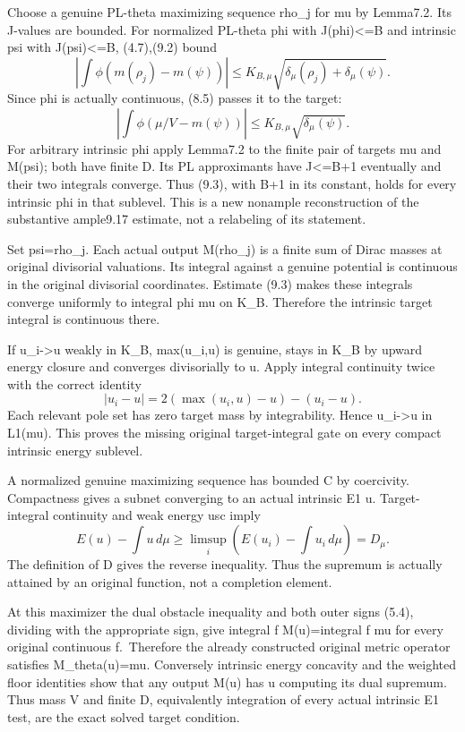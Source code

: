 \documentclass[
  10pt,
]{article}
\begin{document}
Choose a genuine PL-theta maximizing sequence rho\_j for mu by Lemma7.2.
Its J-values are bounded. For normalized PL-theta phi with
J(phi)\textless=B and intrinsic psi with J(psi)\textless=B, (4.7),(9.2)
bound \[
 \left|\int\phi(m(\rho_j)-m(\psi))\right|
 \le K_{B,\mu}\sqrt{\delta_\mu(\rho_j)+\delta_\mu(\psi)}.
\] Since phi is actually continuous, (8.5) passes it to the target: \[
 \left|\int\phi(\mu/V-m(\psi))\right|\le K_{B,\mu}\sqrt{\delta_\mu(\psi)}. \tag{9.3}
\] For arbitrary intrinsic phi apply Lemma7.2 to the finite pair of
targets mu and M(psi); both have finite D. Its PL approximants have
J\textless=B+1 eventually and their two integrals converge. Thus (9.3),
with B+1 in its constant, holds for every intrinsic phi in that
sublevel. This is a new nonample reconstruction of the substantive
ample9.17 estimate, not a relabeling of its statement.

Set psi=rho\_j. Each actual output M(rho\_j) is a finite sum of Dirac
masses at original divisorial valuations. Its integral against a genuine
potential is continuous in the original divisorial coordinates. Estimate
(9.3) makes these integrals converge uniformly to integral phi mu on
K\_B. Therefore the intrinsic target integral is continuous there.

If u\_i-\textgreater u weakly in K\_B, max(u\_i,u) is genuine, stays in
K\_B by upward energy closure and converges divisorially to u. Apply
integral continuity twice with the correct identity \[
 |u_i-u|=2(\max(u_i,u)-u)-(u_i-u).                                     \tag{9.4}
\] Each relevant pole set has zero target mass by integrability. Hence
u\_i-\textgreater u in L1(mu). This proves the missing original
target-integral gate on every compact intrinsic energy sublevel.

A normalized genuine maximizing sequence has bounded C by coercivity.
Compactness gives a subnet converging to an actual intrinsic E1 u.
Target-integral continuity and weak energy usc imply \[
 E(u)-\int u\,d\mu\ge\limsup_i(E(u_i)-\int u_i\,d\mu)=D_\mu.
\] The definition of D gives the reverse inequality. Thus the supremum
is actually attained by an original function, not a completion element.

At this maximizer the dual obstacle inequality and both outer signs
(5.4), dividing with the appropriate sign, give integral f M(u)=integral
f mu for every original continuous f.~Therefore the already constructed
original metric operator satisfies M\_theta(u)=mu. Conversely intrinsic
energy concavity and the weighted floor identities show that any output
M(u) has u computing its dual supremum. Thus mass V and finite D,
equivalently integration of every actual intrinsic E1 test, are the
exact solved target condition.
\end{document}
